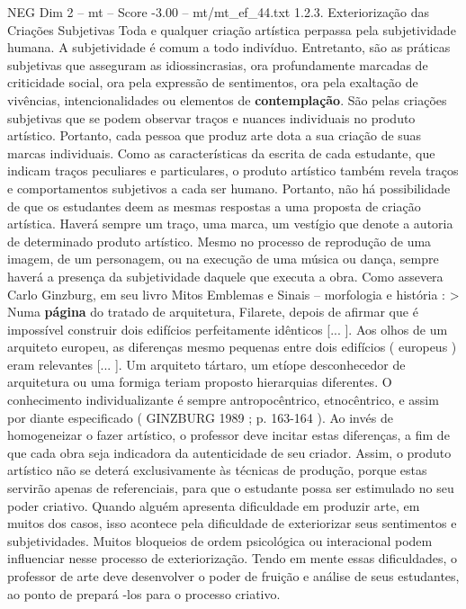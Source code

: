 \begin{textsample}{NEG Dim 2 – mt – Score -3.00 – mt/mt\_ef\_44.txt}  \label{ex:f2_neg_061}
1.2.3.
Exteriorização das Criações Subjetivas Toda e qualquer criação artística perpassa pela subjetividade humana.
A subjetividade é comum a todo indivíduo.
Entretanto, são as práticas subjetivas que asseguram as idiossincrasias, ora profundamente marcadas de criticidade social, ora pela expressão de sentimentos, ora pela exaltação de vivências, intencionalidades ou elementos de \textbf{contemplação}.
São pelas criações subjetivas que se podem observar traços e nuances individuais no produto artístico.
Portanto, cada pessoa que produz arte dota a sua criação de suas marcas individuais.
Como as características da escrita de cada estudante, que indicam traços peculiares e particulares, o produto artístico também revela traços e comportamentos subjetivos a cada ser humano.
Portanto, não há possibilidade de que os estudantes deem as mesmas respostas a uma proposta de criação artística.
Haverá sempre um traço, uma marca, um vestígio que denote a autoria de determinado produto artístico.
Mesmo no processo de reprodução de uma imagem, de um personagem, ou na execução de uma música ou dança, sempre haverá a presença da subjetividade daquele que executa a obra.
Como assevera Carlo Ginzburg, em seu livro Mitos Emblemas e Sinais – morfologia e história : > Numa \textbf{página} do tratado de arquitetura, Filarete, depois de afirmar que é impossível construir dois edifícios perfeitamente idênticos [... ].
Aos olhos de um arquiteto europeu, as diferenças mesmo pequenas entre dois edifícios ( europeus ) eram relevantes [... ].
Um arquiteto tártaro, um etíope desconhecedor de arquitetura ou uma formiga teriam proposto hierarquias diferentes.
O conhecimento individualizante é sempre antropocêntrico, etnocêntrico, e assim por diante especificado ( GINZBURG 1989 ; p. 163-164 ).
Ao invés de homogeneizar o fazer artístico, o professor deve incitar estas diferenças, a fim de que cada obra seja indicadora da autenticidade de seu criador.
Assim, o produto artístico não se deterá exclusivamente às técnicas de produção, porque estas servirão apenas de referenciais, para que o estudante possa ser estimulado no seu poder criativo.
Quando alguém apresenta dificuldade em produzir arte, em muitos dos casos, isso acontece pela dificuldade de exteriorizar seus sentimentos e subjetividades.
Muitos bloqueios de ordem psicológica ou interacional podem influenciar nesse processo de exteriorização.
Tendo em mente essas dificuldades, o professor de arte deve desenvolver o poder de fruição e análise de seus estudantes, ao ponto de prepará -los para o processo criativo.

\end{textsample}
